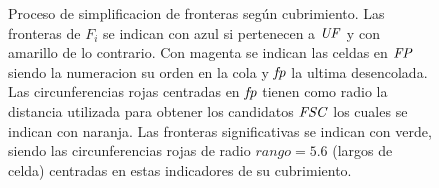\begin{figure}[H]
  \caption[Proceso de simplificacion de fronteras según cubrimiento.]{Proceso
    de simplificacion de fronteras según cubrimiento. Las fronteras de $F_i$ se
    indican con azul si pertenecen a $\mathit{UF}$ y con amarillo de lo contrario.
    Con magenta se indican las celdas en $\mathit{FP}$ siendo la numeracion su
    orden en la cola y $\mathit{fp}$ la ultima desencolada. Las
    circunferencias rojas centradas en $\mathit{fp}$ tienen como radio la distancia
    utilizada para obtener los candidatos $\mathit{FSC}$ los cuales se indican con
    naranja. Las fronteras significativas se indican con verde, siendo las
    circunferencias rojas de radio $rango=5.6$ (largos de celda) centradas en estas indicadores de su
  cubrimiento.}\label{fig:ejemploFSCubComp}

\end{figure}
